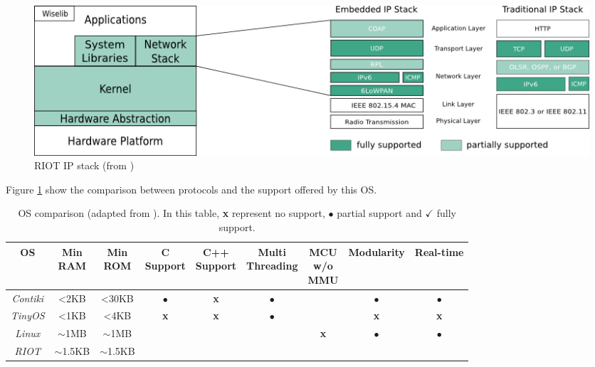 \begin{figure}[htb]
	\centering
	\includegraphics[width=1\columnwidth]{chapters/background.images/RIOTIPStack.png}
	\caption{RIOT IP stack (from \cite{riotOS})}
	\label{fig:RIOTIPStack}
\end{figure}

Figure \ref{fig:RIOTIPStack} show the comparison between protocols and the support offered by this OS. 

\begin{table}[htb]
	\scriptsize
	\centering
	\caption{OS comparison (adapted from \cite{baccelli2013riot}). In this table, \textbf{x} represent no support, $\bullet$ partial support and $\checkmark$ fully support.}
	\label{tab:OSComparison}
	\begin{tabular}{|c|cccccccc}
		\hline
		\textbf{OS} & 
		\multicolumn{1}{p{0.8cm}|}{\textbf{Min} \newline \textbf{RAM}} &
		\multicolumn{1}{p{0.8cm}|}{\textbf{Min} \newline \textbf{ROM}} &
		\multicolumn{1}{p{1.3cm}|}{\textbf{C} \newline \textbf{Support}} &
		\multicolumn{1}{p{1.3cm}|}{\textbf{C++} \newline \textbf{Support}} &
		\multicolumn{1}{p{1.6cm}|}{\textbf{Multi} \newline \textbf{Threading}} &
		\multicolumn{1}{p{1cm}|}{\textbf{MCU} \newline \textbf{w/o} \newline \textbf{MMU}} &
		\multicolumn{1}{c|}{\textbf{Modularity}} &
		\multicolumn{1}{c|}{\textbf{Real-time}} \\ \hline
		\textit{Contiki} & \textless 2KB & \textless 30KB &$\bullet$ & \textbf{x}       & $\bullet$     & \checkmark     &$\bullet$ &    $\bullet$ \\ \cline{1-1}
		\textit{TinyOS}  & \textless 1KB & \textless 4KB  &\textbf{x}& \textbf{x}       & $\bullet$     & \checkmark     &\textbf{x}&   \textbf{x}\\ \cline{1-1}
		\textit{Linux}   & $\mathtt{\sim}$1MB &$\mathtt{\sim}$1MB&\checkmark & \checkmark       &  \checkmark   & \textbf{x} &$\bullet$   &$\bullet$    \\ \cline{1-1}
		\textit{RIOT} & $\mathtt{\sim}$1.5KB & $\mathtt{\sim}$1.5KB & \checkmark    & \checkmark       & \checkmark & \checkmark & \checkmark & \checkmark  \\ \cline{1-1}
	\end{tabular}
\end{table}

